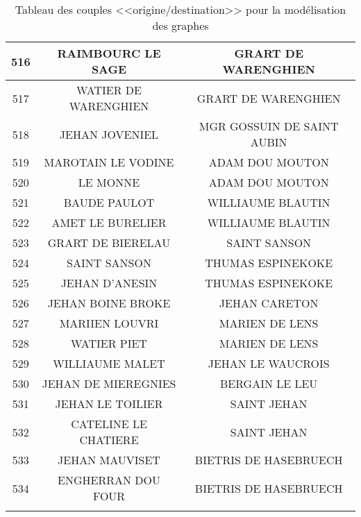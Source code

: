 \begin{center}
\begin{longtable}{|c|c|c|}
\hline	516	&	RAIMBOURC LE SAGE	&	GRART DE WARENGHIEN	\\
\hline	517	&	WATIER DE WARENGHIEN	&	GRART DE WARENGHIEN	\\
\hline	518	&	JEHAN JOVENIEL	&	MGR GOSSUIN DE SAINT AUBIN	\\
\hline	519	&	MAROTAIN LE VODINE	&	ADAM DOU MOUTON	\\
\hline	520	&	LE MONNE	&	ADAM DOU MOUTON	\\
\hline	521	&	BAUDE PAULOT	&	WILLIAUME BLAUTIN	\\
\hline	522	&	AMET LE BURELIER	&	WILLIAUME BLAUTIN	\\
\hline	523	&	GRART DE BIERELAU	&	SAINT SANSON	\\
\hline	524	&	SAINT SANSON	&	THUMAS ESPINEKOKE	\\
\hline	525	&	JEHAN D'ANESIN	&	THUMAS ESPINEKOKE	\\
\hline	526	&	JEHAN BOINE BROKE	&	JEHAN CARETON	\\
\hline	527	&	MARIIEN LOUVRI	&	MARIEN DE LENS	\\
\hline	528	&	WATIER PIET	&	MARIEN DE LENS	\\
\hline	529	&	WILLIAUME MALET	&	JEHAN LE WAUCROIS	\\
\hline	530	&	JEHAN DE MIEREGNIES	&	BERGAIN LE LEU	\\
\hline	531	&	JEHAN LE TOILIER	&	SAINT JEHAN	\\
\hline	532	&	CATELINE LE CHATIERE	&	SAINT JEHAN	\\
\hline	533	&	JEHAN MAUVISET	&	BIETRIS DE HASEBRUECH	\\
\hline	534	&	ENGHERRAN DOU FOUR	&	BIETRIS DE HASEBRUECH	\\
\hline
	\caption{Tableau des couples <<origine/destination>> pour la modélisation des graphes}	
	\label{df_links}
    \end{longtable}
\end{center}

\normalsize